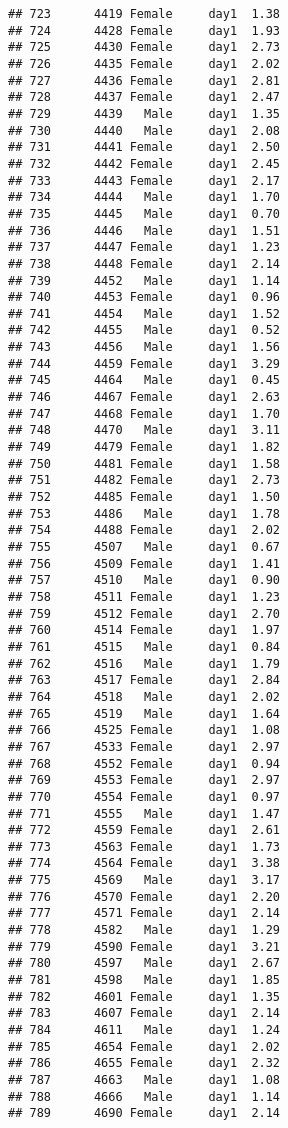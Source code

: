 \documentclass[
]{article}
\begin{document}
\begin{verbatim}
## 723      4419 Female     day1  1.38
## 724      4428 Female     day1  1.93
## 725      4430 Female     day1  2.73
## 726      4435 Female     day1  2.02
## 727      4436 Female     day1  2.81
## 728      4437 Female     day1  2.47
## 729      4439   Male     day1  1.35
## 730      4440   Male     day1  2.08
## 731      4441 Female     day1  2.50
## 732      4442 Female     day1  2.45
## 733      4443 Female     day1  2.17
## 734      4444   Male     day1  1.70
## 735      4445   Male     day1  0.70
## 736      4446   Male     day1  1.51
## 737      4447 Female     day1  1.23
## 738      4448 Female     day1  2.14
## 739      4452   Male     day1  1.14
## 740      4453 Female     day1  0.96
## 741      4454   Male     day1  1.52
## 742      4455   Male     day1  0.52
## 743      4456   Male     day1  1.56
## 744      4459 Female     day1  3.29
## 745      4464   Male     day1  0.45
## 746      4467 Female     day1  2.63
## 747      4468 Female     day1  1.70
## 748      4470   Male     day1  3.11
## 749      4479 Female     day1  1.82
## 750      4481 Female     day1  1.58
## 751      4482 Female     day1  2.73
## 752      4485 Female     day1  1.50
## 753      4486   Male     day1  1.78
## 754      4488 Female     day1  2.02
## 755      4507   Male     day1  0.67
## 756      4509 Female     day1  1.41
## 757      4510   Male     day1  0.90
## 758      4511 Female     day1  1.23
## 759      4512 Female     day1  2.70
## 760      4514 Female     day1  1.97
## 761      4515   Male     day1  0.84
## 762      4516   Male     day1  1.79
## 763      4517 Female     day1  2.84
## 764      4518   Male     day1  2.02
## 765      4519   Male     day1  1.64
## 766      4525 Female     day1  1.08
## 767      4533 Female     day1  2.97
## 768      4552 Female     day1  0.94
## 769      4553 Female     day1  2.97
## 770      4554 Female     day1  0.97
## 771      4555   Male     day1  1.47
## 772      4559 Female     day1  2.61
## 773      4563 Female     day1  1.73
## 774      4564 Female     day1  3.38
## 775      4569   Male     day1  3.17
## 776      4570 Female     day1  2.20
## 777      4571 Female     day1  2.14
## 778      4582   Male     day1  1.29
## 779      4590 Female     day1  3.21
## 780      4597   Male     day1  2.67
## 781      4598   Male     day1  1.85
## 782      4601 Female     day1  1.35
## 783      4607 Female     day1  2.14
## 784      4611   Male     day1  1.24
## 785      4654 Female     day1  2.02
## 786      4655 Female     day1  2.32
## 787      4663   Male     day1  1.08
## 788      4666   Male     day1  1.14
## 789      4690 Female     day1  2.14

\end{verbatim}
\end{document}
